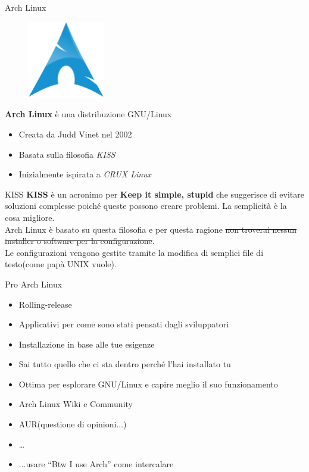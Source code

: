 \begin{frame}{Arch Linux}
    \begin{figure}[h]
        \includegraphics[width=0.3\textwidth]{images/Archlinux-icon-crystal-64.png}
    \end{figure}
    \textbf{Arch Linux} è una distribuzione GNU/Linux\\

    \begin{itemize}
        \item Creata da Judd Vinet nel 2002
        \item Basata sulla filosofia \textit{KISS}
        \item Inizialmente ispirata a \textit{CRUX Linux}
    \end{itemize}
\end{frame}


\begin{frame}{KISS}
    \textbf{KISS} è un acronimo per \textbf{Keep it simple, stupid} che suggerisce di evitare soluzioni  complesse
    poiché queste possono creare problemi. La semplicità è la cosa migliore.\\

    Arch Linux è basato su questa filosofia e per questa ragione \sout{non troverai nessun installer o software per la configurazione}.\\
    Le configurazioni vengono gestite tramite la modifica di semplici file di testo(come papà UNIX vuole).
\end{frame}


\begin{frame}{Pro Arch Linux}
    \begin{itemize}
        \item Rolling-release
        \item Applicativi per come sono stati pensati dagli sviluppatori
        \item Installazione in base alle tue esigenze
        \item Sai tutto quello che ci sta dentro perché l'hai installato tu
        \item Ottima per esplorare GNU/Linux e capire meglio il suo funzionamento
        \item Arch Linux Wiki e Community
        \item AUR(questione di opinioni...)
        \item \dots
        \item ...usare ``Btw I use Arch'' come intercalare
    \end{itemize}

\end{frame}

